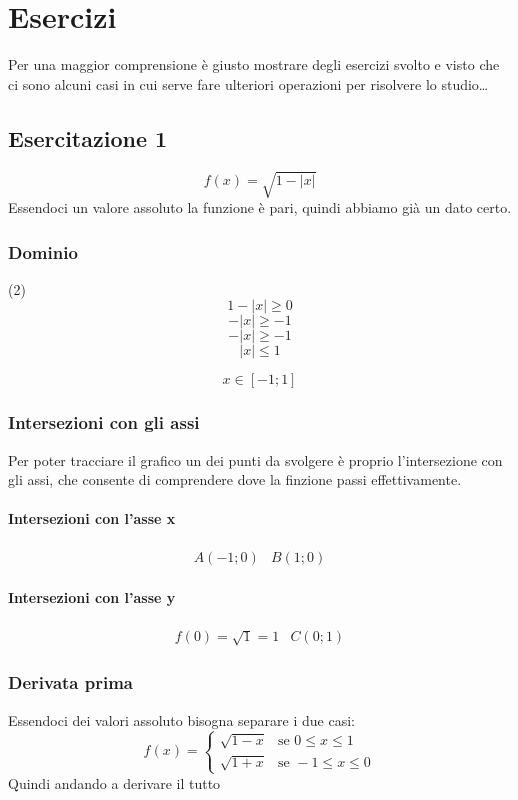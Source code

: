 \section{Esercizi}
Per una maggior comprensione è giusto mostrare degli esercizi svolto e visto che ci sono alcuni casi in cui serve fare ulteriori operazioni per risolvere lo studio\dots
\subsection{Esercitazione 1}
\begin{equation}
	f(x)=\sqrt{1-|x|}
\end{equation}
Essendoci un valore assoluto la funzione è pari, quindi abbiamo già un dato certo.
\subsubsection{Dominio}
\begin{tasks}(2)
	\task \begin{equation*}
	1-|x|\geq 0
\end{equation*}
	\task \begin{equation*}
	-|x|\geq -1
\end{equation*}
	\task \begin{equation*}
	-|x|\geq -1
\end{equation*}
	\task \begin{equation*}
	|x|\leq 1
\end{equation*}
\end{tasks}
\[
	x\in[-1;1]
\]
\subsubsection{Intersezioni con gli assi}
Per poter tracciare il grafico un dei punti da svolgere è proprio l'intersezione con gli assi, che consente di comprendere dove la finzione passi effettivamente.
\paragraph{Intersezioni con l'asse x}
\begin{eqnarray*}
	A(-1;0)&B(1;0)
\end{eqnarray*}
\paragraph{Intersezioni con l'asse y}
\begin{eqnarray*}
	f(0)=\sqrt{1}=1&C(0;1)
\end{eqnarray*}
\subsubsection{Derivata prima}
Essendoci dei valori assoluto bisogna separare i due casi:
\begin{equation*}
	f(x)=\begin{cases}
		\sqrt{1-x}&\text{se }0\leq x\leq 1\\
		\sqrt{1+x}&\text{se }-1\leq x\leq 0
	\end{cases}
\end{equation*}
Quindi andando a derivare il tutto
